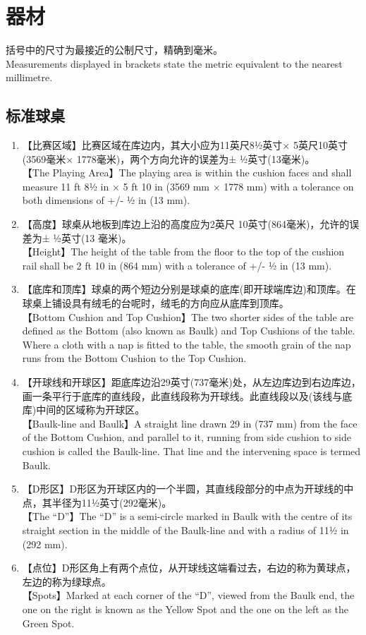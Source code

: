\section{器材}\label{221}

\noindent 括号中的尺寸为最接近的公制尺寸，精确到毫米。\\
Measurements displayed in brackets state the metric equivalent 
to the nearest millimetre.

\subsection{标准球桌}\label{2211}

\begin{enumerate}[label=(\alph*)]
    \item 【比赛区域】比赛区域在库边内，其大小应为11英尺8½英寸× 5英尺10英寸(3569毫米× 1778毫米)，两个方向允许的误差为± ½英寸(13毫米)。\\
    【The Playing Area】The playing area is within the cushion faces and shall measure 11 ft 8½ in × 5 ft 10 in (3569 mm × 1778 mm) with a tolerance on both dimensions of +/- ½ in (13 mm).
    \item 【高度】球桌从地板到库边上沿的高度应为2英尺 10英寸(864毫米)，允许的误差为± ½英寸(13 毫米)。\\
    【Height】The height of the table from the floor to the top of the cushion rail shall be 2 ft 10 in (864 mm) with a tolerance of +/- ½ in (13 mm).
    \item 【底库和顶库】球桌的两个短边分别是球桌的底库(即开球端库边)和顶库。在球桌上铺设具有绒毛的台呢时，绒毛的方向应从底库到顶库。\\
    【Bottom Cushion and Top Cushion】The two shorter sides of the table are defined as the Bottom (also known as Baulk) and Top Cushions of the table. Where a cloth with a nap is fitted to the table, the smooth grain of the nap runs from the Bottom Cushion to the Top Cushion.
    \item 【开球线和开球区】距底库边沿29英寸(737毫米)处，从左边库边到右边库边，画一条平行于底库的直线段，此直线段称为开球线。此直线段以及(该线与底库)中间的区域称为开球区。\\
    【Baulk-line and Baulk】A straight line drawn 29 in (737 mm) from the face of the Bottom Cushion, and parallel to it, running from side cushion to side cushion is called the Baulk-line. That line and the intervening space is termed Baulk.
    \item 【D形区】D形区为开球区内的一个半圆，其直线段部分的中点为开球线的中点，其半径为11½英寸(292毫米)。\\
    【The ``D''】The ``D'' is a semi-circle marked in Baulk with the centre of its straight section in the middle of the Baulk-line and with a 
    radius of 11½ in (292 mm).
    \item \label{2211f}【点位】D形区角上有两个点位，从开球线这端看过去，右边的称为黄球点，左边的称为绿球点。\\
    【Spots】Marked at each corner of the ``D'', viewed from the Baulk end, the one on the right is known as the Yellow Spot and the one on the left as the Green Spot.


\end{enumerate}
